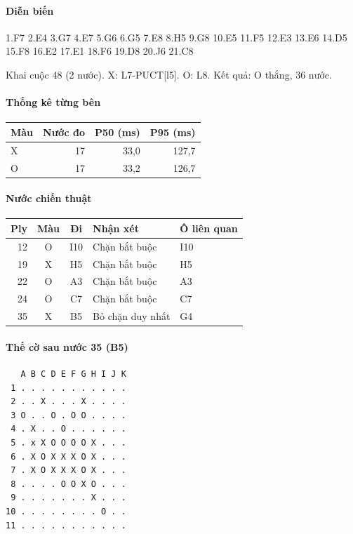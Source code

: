 \paragraph{Diễn biến}
{\footnotesize 1.F7 2.E4 3.G7 4.E7 5.G6 6.G5 7.E8 8.H5 9.G8 10.E5 11.F5 12.E3 13.E6 14.D5 15.F8 16.E2 17.E1 18.F6 19.D8 20.J6 21.C8\par}
Khai cuộc 48 (2 nước). X: L7-PUCT[l5]. O: L8. Kết quả: O thắng, 36 nước.
\paragraph{Thống kê từng bên}
\begin{center}\small
\begin{tabular}{@{}lrrr@{}}
\toprule
Màu & Nước đo & P50 (ms) & P95 (ms) \\
\midrule
X & 17 & 33,0 & 127,7 \\
O & 17 & 33,2 & 126,7 \\
\bottomrule
\end{tabular}
\end{center}
\paragraph{Nước chiến thuật}
\begin{center}\small
\begin{tabular}{@{}rccll@{}}
\toprule
Ply & Màu & Đi & Nhận xét & Ô liên quan \\
\midrule
12 & O & I10 & Chặn bắt buộc & I10 \\
19 & X & H5 & Chặn bắt buộc & H5 \\
22 & O & A3 & Chặn bắt buộc & A3 \\
24 & O & C7 & Chặn bắt buộc & C7 \\
35 & X & B5 & Bỏ chặn duy nhất & G4 \\
\bottomrule
\end{tabular}
\end{center}
\paragraph{Thế cờ sau nước 35 (B5)}
\begin{verbatim}
   A B C D E F G H I J K
 1 . . . . . . . . . . .
 2 . . X . . . X . . . .
 3 O . . O . O O . . . .
 4 . X . . O . . . . . .
 5 . x X O O O O X . . .
 6 . X O X X X O X . . .
 7 . X O X X X O X . . .
 8 . . . . O O X O . . .
 9 . . . . . . . X . . .
10 . . . . . . . . O . .
11 . . . . . . . . . . .
\end{verbatim}
